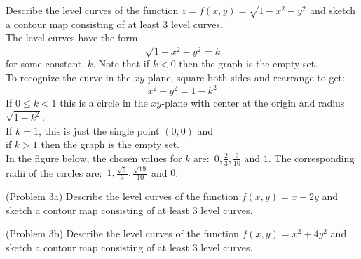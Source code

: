 \documentclass[handout]{ximera}
\begin{document}
\begin{example}[Example 3]
Describe the level curves of the function $z = f(x, y) = \sqrt{1-x^2 - y^2}$ and sketch a contour map consisting of at least 3 level curves.\\
The level curves have the form 
\[
\sqrt{1 - x^2 - y^2} = k
\]
for some constant, $k$. Note that if $k < 0$ then the graph is the empty set.\\
To recognize the curve in the $xy$-plane, square both sides and rearrange to get:
\[
x^2 + y^2 = 1- k^2 
\]
If $0 \leq k < 1$ this is a circle in the $xy$-plane with center at the origin and radius $\sqrt{1-k^2}$.\\
If $k = 1$, this is just the single point $(0, 0)$ and \\
if $k>1$ then the graph is the empty set.\\
In the figure below, the chosen values for $k$ are: $\,0, \frac23, \frac{9}{10}$ and  $1$.
The corresponding radii of the circles are: $\,1, \frac{\sqrt{5}}{3}, \frac{\sqrt{19}}{10}$ and $0$.

\begin{image}
\end{image}

\end{example}

\begin{problem}(Problem 3a)
Describe the level curves of the function $f(x,y) = x - 2y$ and sketch a contour map consisting of at least 3 level curves.\\
\end{problem}

\begin{problem}(Problem 3b)
Describe the level curves of the function $f(x, y) = x^2 + 4y^2$ and sketch a contour map consisting of at least 3 level curves.\\
\end{problem}
\end{document}
